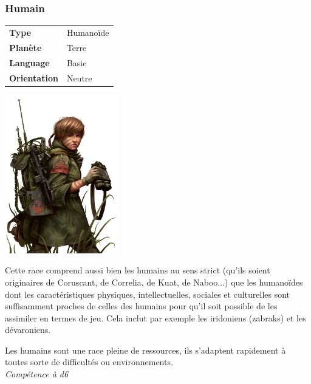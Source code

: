 \subsubsection{Humain}
\begin{flushright}
\begin{tabular}{ l l }
	\textbf{Type} 			& Humanoïde \\
   	\textbf{Planète} 		& Terre \\
   	\textbf{Language} 		& Basic \\
   	\textbf{Orientation} 	& Neutre \\
\end{tabular}
\vspace{-6\baselineskip}
\end{flushright}


\includegraphics[width=5cm]{img/races/humain.png} 

Cette race comprend aussi bien les humains au sens strict (qu’ils soient originaires de Coruscant, de Correlia, de Kuat, de Naboo...) que les humanoïdes dont les caractéristiques physiques, intellectuelles, sociales et culturelles sont suffisamment proches de celles des humains pour qu’il soit possible de les assimiler en termes de jeu. Cela inclut par exemple les iridoniens (zabraks) et les dévaroniens.

\begin{description}[align=left]
\item [Adaptabilité] 	%
	Les humains sont une race pleine de ressources, ils s'adaptent rapidement à toutes sorte de difficultés ou environnements.\\
	\emph{Compétence à d6}
\end{description}